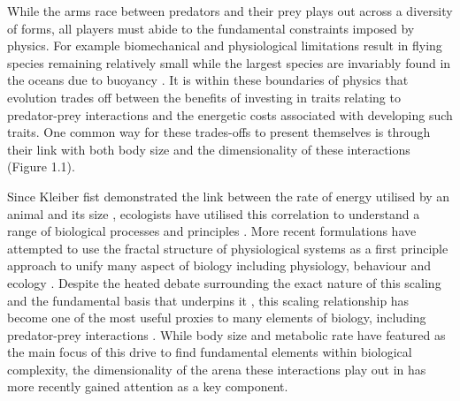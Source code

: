 While the arms race between predators and their prey plays out across a diversity of forms, all players must abide to the fundamental constraints imposed by physics. For example biomechanical and physiological limitations result in flying species remaining relatively small \citep{chatterjee2007aerodynamics,dudley2002mechanisms} while the largest species are invariably found in the oceans due to buoyancy \citep{heim2015cope}. It is within these boundaries of physics that evolution trades off between the benefits of investing in traits relating to predator-prey interactions and the energetic costs associated with developing such traits. One common way for these trades-offs to present themselves is through their link with both body size and the dimensionality of these interactions (Figure 1.1).

Since Kleiber fist demonstrated the link between the rate of energy utilised by an animal and its size \citep{kleiber1947body}, ecologists have utilised this correlation to understand a range of biological processes and principles \citep{sibly2012metabolic,west1997general,brown2004}. More recent formulations have attempted to use the fractal structure of physiological systems as a first principle approach to unify many aspect of biology including physiology, behaviour and ecology \citep{west1997general,brown2004}. Despite the heated debate surrounding the exact nature of this scaling and the fundamental basis that underpins it \citep{isaac2010metabolic}, this scaling relationship has become one of the most useful proxies to many elements of biology, including predator-prey interactions \citep{brown2004}. While body size and metabolic rate have featured as the main focus of this drive to find fundamental elements within biological complexity, the dimensionality of the arena these interactions play out in has more recently gained attention as a key component.


